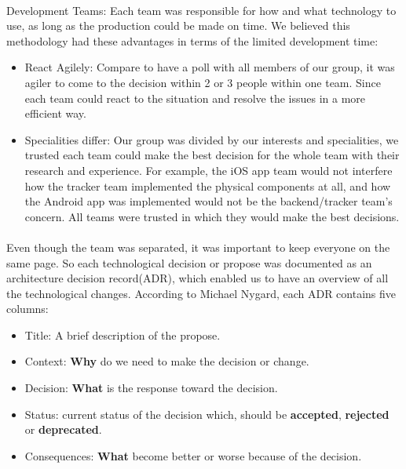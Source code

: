 \documentclass[12pt,a4paper]{article}
\begin{document}
        \paragraph{}Development Teams: Each team was responsible for how and what technology to use, as long as the production could be made on time. We believed this methodology had these advantages in terms of the limited development time:

        \begin{itemize}
          \item {React Agilely}: Compare to have a poll with all members of our group, it was agiler to come to the decision within 2 or 3 people within one team. Since each team could react to the situation and resolve the issues in a more efficient way.
          \item {Specialities differ}: Our group was divided by our interests and specialities, we trusted each team could make the best decision for the whole team with their research and experience. For example, the iOS app team would not interfere how the tracker team implemented the physical components at all, and how the Android app was implemented would not be the backend/tracker team's concern. All teams were trusted in which they would make the best decisions.
        \end{itemize}
        
        \paragraph{}Even though the team was separated, it was important to keep everyone on the same page. So each technological decision or propose was documented as an architecture decision record(ADR), which enabled us to have an overview of all the technological changes. According to Michael Nygard, each ADR contains five columns\cite{ArchitectureDecisionRecord}: 

        \begin{itemize}
          \item Title: A brief description of the propose.
          \item Context: {\bf Why} do we need to make the decision or change.                   
          \item Decision: {\bf What} is the response toward the decision.
          \item Status: current status of the decision which, should be {\bf accepted}, {\bf rejected} or {\bf deprecated}.
          \item Consequences: {\bf What} become better or worse because of the decision.
        \end{itemize}
\end{document}
